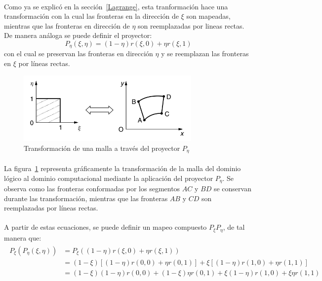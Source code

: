 \documentclass[letterpaper, openright, 12pt]{book}
\begin{document}
    \paragraph*{}
    Como ya se explicó en la sección~\ref{Lagrange}, esta tranformación hace
    una transformación con la cual las fronteras en la dirección de $\xi$
    son mapeadas, mientras que las fronteras en dirección de $\eta$ son
    reemplazadas por lineas rectas. De manera análoga se puede definir el
    proyector:
    \begin{equation}
        P_{\eta}(\xi, \eta) = (1 - \eta)r(\xi, 0) + \eta r(\xi, 1)
    \end{equation}
    con el cual se preservan las fronteras en dirección $\eta$ y se
    reemplazan las fronteras en $\xi$ por líneas rectas.
    \begin{figure}[htbp!]
        \centering
        \includegraphics[keepaspectratio, width=0.8\textwidth]{./img/mapeo_eta}
        \caption[Transformación de malla por $P_{\eta}$]{Transformación de
        una malla a través del proyector $P_{\eta}$ \cite{farrashkhalvat}}
        \label{fig:mapeo_eta}
    \end{figure}

    \paragraph*{}
    La figura~\ref{fig:mapeo_eta} representa gráficamente la transformación
    de la malla del dominio lógico al dominio computacional mediante la
    aplicación del proyector $P_{\eta}$. Se observa como las fronteras
    conformadas por los segmentos $AC$ y $BD$ se conservan durante las
    transformación, mientras que las fronteras $AB$ y $CD$ son reemplazadas
    por líneas rectas.

    \paragraph*{}
    A partir de estas ecuaciones, se puede definir un mapeo compuesto
    $P_{\xi}P_{\eta}$, de tal manera que:
    \begin{align}
        \begin{aligned}
            P_{\xi}(P_{\eta}(\xi, \eta)) &= P_{\xi} ((1 - \eta)r(\xi, 0) + \eta r(\xi, 1)) \\
            &= (1 - \xi) \left[ (1 - \eta)r(0, 0) + \eta r(0, 1) \right] + \xi \left[ (1 - \eta)r(1, 0) + \eta r(1,1) \right]\\
            &= (1 - \xi)(1 - \eta)r(0, 0) + (1-\xi)\eta r(0, 1) + \xi(1 - \eta)r(1, 0) + \xi\eta r(1, 1)
        \end{aligned}
    \end{align}
\end{document}
